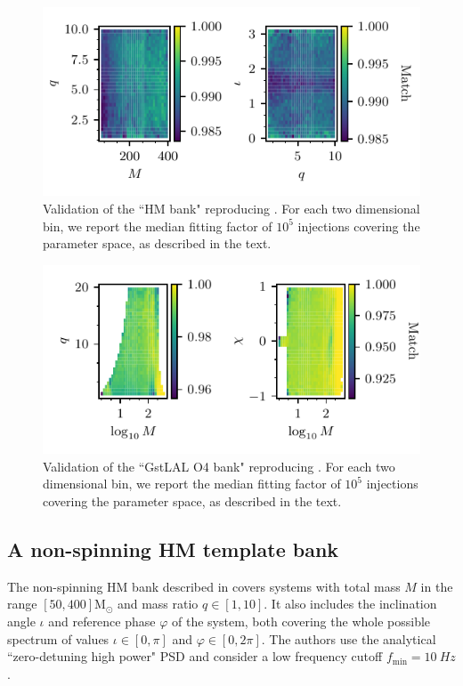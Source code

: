 \documentclass[twocolumn,showpacs,preprintnumbers,nofootinbib,prd,
superscriptaddress,10pt]{revtex4-2}
\begin{document}
\begin{figure}
	\includegraphics[scale = 1.]{symphony_HM_injections}
	\caption{Validation of the ``HM bank" reproducing \cite{Harry:2017weg}. For each two dimensional bin, we report the median fitting factor of $10^5$ injections covering the parameter space, as described in the text.}
	\label{fig:symphony_HM_injections}
\end{figure}

\begin{figure}
	\includegraphics[scale = 1.]{bank_O4_injections}
	\caption{Validation of the ``GstLAL O4 bank" reproducing \cite{Sakon:2022ibh}. For each two dimensional bin, we report the median fitting factor of $10^5$ injections covering the parameter space, as described in the text.}
	\label{fig:bank_O4_injections}
\end{figure}

\subsection{A non-spinning HM template bank} \label{sec:HM_comparison}

The non-spinning HM bank described in \cite{Harry:2017weg} covers systems with total mass $M$ in the range $[50, 400] \mathrm{M_\odot}$ and mass ratio $q\in [1,10]$. It also includes the inclination angle $\iota$ and reference phase $\varphi$ of the system, both covering the whole possible spectrum of values $\iota\in [0,\pi]$ and $\varphi\in [0,2\pi]$.
The authors use the analytical ``zero-detuning high power" PSD \cite{OLD_PSDs} and consider a low frequency cutoff $f_\text{min} = \SI{10}{Hz}$.
\end{document}
